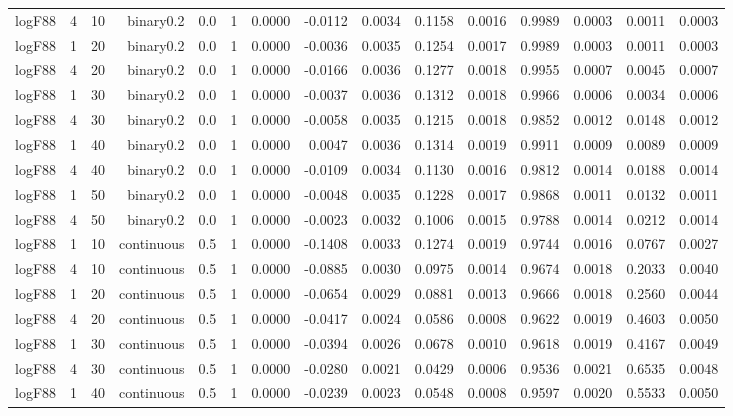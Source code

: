 \begin{longtable}{rrrrrrrrrrrrrrr}
  logF88 & 4 & 10 & binary0.2 & 0.0 & 1 & 0.0000 & -0.0112 & 0.0034 & 0.1158 & 0.0016 & 0.9989 & 0.0003 & 0.0011 & 0.0003 \\ 
  logF88 & 1 & 20 & binary0.2 & 0.0 & 1 & 0.0000 & -0.0036 & 0.0035 & 0.1254 & 0.0017 & 0.9989 & 0.0003 & 0.0011 & 0.0003 \\ 
  logF88 & 4 & 20 & binary0.2 & 0.0 & 1 & 0.0000 & -0.0166 & 0.0036 & 0.1277 & 0.0018 & 0.9955 & 0.0007 & 0.0045 & 0.0007 \\ 
  logF88 & 1 & 30 & binary0.2 & 0.0 & 1 & 0.0000 & -0.0037 & 0.0036 & 0.1312 & 0.0018 & 0.9966 & 0.0006 & 0.0034 & 0.0006 \\ 
  logF88 & 4 & 30 & binary0.2 & 0.0 & 1 & 0.0000 & -0.0058 & 0.0035 & 0.1215 & 0.0018 & 0.9852 & 0.0012 & 0.0148 & 0.0012 \\ 
  logF88 & 1 & 40 & binary0.2 & 0.0 & 1 & 0.0000 & 0.0047 & 0.0036 & 0.1314 & 0.0019 & 0.9911 & 0.0009 & 0.0089 & 0.0009 \\ 
  logF88 & 4 & 40 & binary0.2 & 0.0 & 1 & 0.0000 & -0.0109 & 0.0034 & 0.1130 & 0.0016 & 0.9812 & 0.0014 & 0.0188 & 0.0014 \\ 
  logF88 & 1 & 50 & binary0.2 & 0.0 & 1 & 0.0000 & -0.0048 & 0.0035 & 0.1228 & 0.0017 & 0.9868 & 0.0011 & 0.0132 & 0.0011 \\ 
  logF88 & 4 & 50 & binary0.2 & 0.0 & 1 & 0.0000 & -0.0023 & 0.0032 & 0.1006 & 0.0015 & 0.9788 & 0.0014 & 0.0212 & 0.0014 \\ 
  logF88 & 1 & 10 & continuous & 0.5 & 1 & 0.0000 & -0.1408 & 0.0033 & 0.1274 & 0.0019 & 0.9744 & 0.0016 & 0.0767 & 0.0027 \\ 
  logF88 & 4 & 10 & continuous & 0.5 & 1 & 0.0000 & -0.0885 & 0.0030 & 0.0975 & 0.0014 & 0.9674 & 0.0018 & 0.2033 & 0.0040 \\ 
  logF88 & 1 & 20 & continuous & 0.5 & 1 & 0.0000 & -0.0654 & 0.0029 & 0.0881 & 0.0013 & 0.9666 & 0.0018 & 0.2560 & 0.0044 \\ 
  logF88 & 4 & 20 & continuous & 0.5 & 1 & 0.0000 & -0.0417 & 0.0024 & 0.0586 & 0.0008 & 0.9622 & 0.0019 & 0.4603 & 0.0050 \\ 
  logF88 & 1 & 30 & continuous & 0.5 & 1 & 0.0000 & -0.0394 & 0.0026 & 0.0678 & 0.0010 & 0.9618 & 0.0019 & 0.4167 & 0.0049 \\ 
  logF88 & 4 & 30 & continuous & 0.5 & 1 & 0.0000 & -0.0280 & 0.0021 & 0.0429 & 0.0006 & 0.9536 & 0.0021 & 0.6535 & 0.0048 \\ 
  logF88 & 1 & 40 & continuous & 0.5 & 1 & 0.0000 & -0.0239 & 0.0023 & 0.0548 & 0.0008 & 0.9597 & 0.0020 & 0.5533 & 0.0050 \\ 

\end{longtable}
